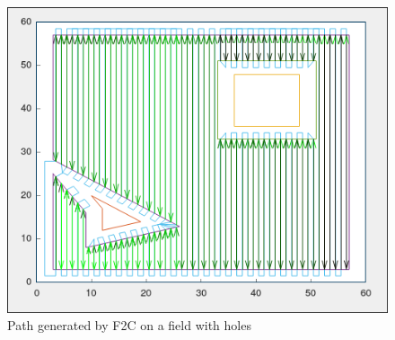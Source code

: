 \documentclass[progress]{cmpreport}
\begin{document}
\begin{appendix}
\begin{figure}[H]
		\begin{minipage}[b]{0.75\textwidth}
			\centering
			\includegraphics[width=\textwidth]{images/F2CPathHoles.jpg}
			\caption{Path generated by F2C on a field with holes}
		\end{minipage}

		\hfill

	\end{figure}

\end{appendix}

% 

\end{document}

